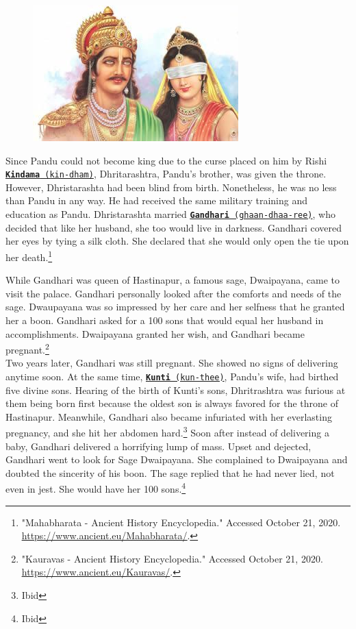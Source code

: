 \documentclass[10pt, letterpaper]{article}
\begin{document}
\begin{figure}
\centering
\includegraphics[scale = 0.6]{image5.png}
\end{figure}

Since Pandu could not become king due to the curse placed on him by
Rishi
\texttt{\underline{\href{https://drive.google.com/file/d/1wyiIggoZmhyi-JTpN7m8qYUUnm89fVhN/view?usp=sharing}{\textbf{Kindama}}
(kin-dham)}}, Dhritarashtra, Pandu's brother, was given the throne.
However, Dhristarashta had been blind from birth. Nonetheless, he was no
less than Pandu in any way. He had received the same military training
and education as Pandu. Dhristarashta married
\texttt{\underline{\href{https://drive.google.com/file/d/1a35me9JQc6RU3jx1ZZiAjeBDBq_GsP5X/view?usp=sharing}{\textbf{Gandhari}}
(ghaan-dhaa-ree)}}, who decided that like her husband, she too would live
in darkness. Gandhari covered her eyes by tying a silk cloth. She
declared that she would only open the tie upon her
death.\footnote{"Mahabharata - Ancient History Encyclopedia." Accessed
  October 21, 2020.
  \href{https://www.ancient.eu/Mahabharata/}{\underline{https://www.ancient.eu/Mahabharata/}}.}

While Gandhari was queen of Hastinapur, a famous sage, Dwaipayana, came
to visit the palace. Gandhari personally looked after the comforts and
needs of the sage. Dwaupayana was so impressed by her care and her
selfness that he granted her a boon. Gandhari asked for a 100 sons that
would equal her husband in accomplishments. Dwaipayana granted her wish,
and Gandhari became pregnant.\footnote{"Kauravas - Ancient History
  Encyclopedia." Accessed October 21, 2020.
  \href{https://www.ancient.eu/Kauravas/}{\underline{https://www.ancient.eu/Kauravas/}}.} \\

Two years later, Gandhari was still pregnant. She showed no signs of
delivering anytime soon. At the same time,
\texttt{\underline{\href{https://drive.google.com/file/d/1_UA258lmi4N9VQho4kpciVNRPHq_zYGq/view?usp=sharing}{\textbf{Kunti}}
(kun-thee)}}, Pandu's wife, had birthed five divine sons. Hearing of the
birth of Kunti's sons, Dhritrashtra was furious at them being born first
because the oldest son is always favored for the throne of Hastinapur.
Meanwhile, Gandhari also became infuriated with her everlasting
pregnancy, and she hit her abdomen hard.\footnote{Ibid} Soon after
instead of delivering a baby, Gandhari delivered a horrifying lump of
mass. Upset and dejected, Gandhari went to look for Sage Dwaipayana. She
complained to Dwaipayana and doubted the sincerity of his boon. The sage
replied that he had never lied, not even in jest. She would have her 100
sons.\footnote{Ibid} \\
\end{document}
